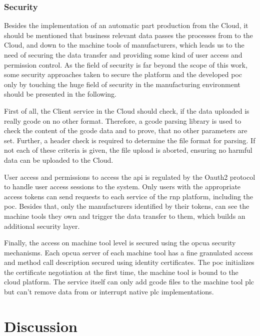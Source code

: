 \documentclass[
a4paper,
twoside,
headsepline,
cleardoublepage=empty,
parskip=half,
draft=false
]{scrbook}
\begin{document}
			\subsection{Security} \label{subsec:security}

				Besides the implementation of an automatic part production from the Cloud, it should be mentioned that business relevant data passes the processes from to the Cloud, and down to the machine tools of manufacturers, which leads us to the need of securing the data transfer and providing some kind of user access and permission control. 
				As the field of security is far beyond the scope of this work, some security approaches taken to secure the platform and the developed \gls{poc} only by touching the huge field of security in the manufacturing environment should be presented in the following.

				First of all, the Client service in the Cloud should check, if the data uploaded is really \gls{gcode} on no other format. Therefore, a \gls{gcode} parsing library is used to check the content of the \gls{gcode} data and to prove, that no other parameters are set. Further, a header check is required to determine the file format for parsing. If not each of these criteria is given, the file upload is aborted, ensuring no harmful data can be uploaded to the Cloud.

				User access and permissions to access the \gls{api} is regulated by the Oauth2 protocol to handle user access sessions to the system. Only users with the appropriate access tokens can send requests to each service of the \gls{rnp} platform, including the \gls{poc}. Besides that, only the manufacturers identified by their tokens, can see the machine tools they own and trigger the data transfer to them, which builds an additional security layer.

				Finally, the access on machine tool level is secured using the \gls{opcua} security mechanisms. Each \gls{opcua} server of each machine tool has a fine granulated access and method call description secured using identity certificates. The \gls{poc} initializes the certificate negotiation at the first time, the machine tool is bound to the cloud platform. The service itself can only add \gls{gcode} files to the machine tool \gls{plc} but can't remove data from or interrupt native \gls{plc} implementations.

	\chapter{Discussion} \label{ch:discusion}
\end{document}
